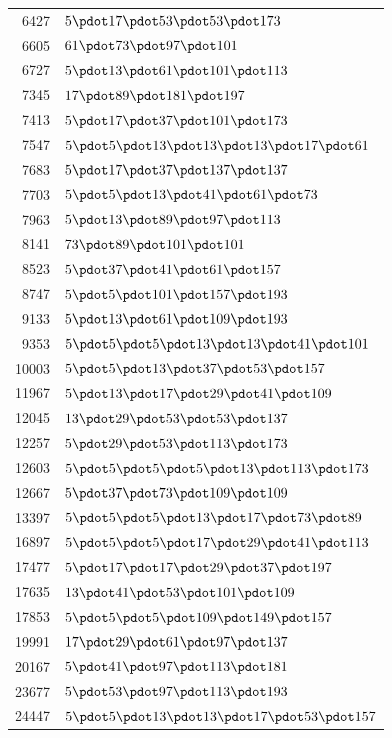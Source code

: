 \begin{longtable}{@{}r|l@{}}
6427 & $5\pdot 17\pdot 53\pdot 53\pdot 173$\\
6605 & $61\pdot 73\pdot 97\pdot 101$\\
6727 & $5\pdot 13\pdot 61\pdot 101\pdot 113$\\
7345 & $17\pdot 89\pdot 181\pdot 197$\\
7413 & $5\pdot 17\pdot 37\pdot 101\pdot 173$\\
7547 & $5\pdot 5\pdot 13\pdot 13\pdot 13\pdot 17\pdot 61$\\
7683 & $5\pdot 17\pdot 37\pdot 137\pdot 137$\\
7703 & $5\pdot 5\pdot 13\pdot 41\pdot 61\pdot 73$\\
7963 & $5\pdot 13\pdot 89\pdot 97\pdot 113$\\
8141 & $73\pdot 89\pdot 101\pdot 101$\\
8523 & $5\pdot 37\pdot 41\pdot 61\pdot 157$\\
8747 & $5\pdot 5\pdot 101\pdot 157\pdot 193$\\
9133 & $5\pdot 13\pdot 61\pdot 109\pdot 193$\\
9353 & $5\pdot 5\pdot 5\pdot 13\pdot 13\pdot 41\pdot 101$\\
10003 & $5\pdot 5\pdot 13\pdot 37\pdot 53\pdot 157$\\
11967 & $5\pdot 13\pdot 17\pdot 29\pdot 41\pdot 109$\\
12045 & $13\pdot 29\pdot 53\pdot 53\pdot 137$\\
12257 & $5\pdot 29\pdot 53\pdot 113\pdot 173$\\
12603 & $5\pdot 5\pdot 5\pdot 5\pdot 13\pdot 113\pdot 173$\\
12667 & $5\pdot 37\pdot 73\pdot 109\pdot 109$\\
13397 & $5\pdot 5\pdot 5\pdot 13\pdot 17\pdot 73\pdot 89$\\
16897 & $5\pdot 5\pdot 5\pdot 17\pdot 29\pdot 41\pdot 113$\\
17477 & $5\pdot 17\pdot 17\pdot 29\pdot 37\pdot 197$\\
17635 & $13\pdot 41\pdot 53\pdot 101\pdot 109$\\
17853 & $5\pdot 5\pdot 5\pdot 109\pdot 149\pdot 157$\\
19991 & $17\pdot 29\pdot 61\pdot 97\pdot 137$\\
20167 & $5\pdot 41\pdot 97\pdot 113\pdot 181$\\
23677 & $5\pdot 53\pdot 97\pdot 113\pdot 193$\\
24447 & $5\pdot 5\pdot 13\pdot 13\pdot 17\pdot 53\pdot 157$\\

\end{longtable}
